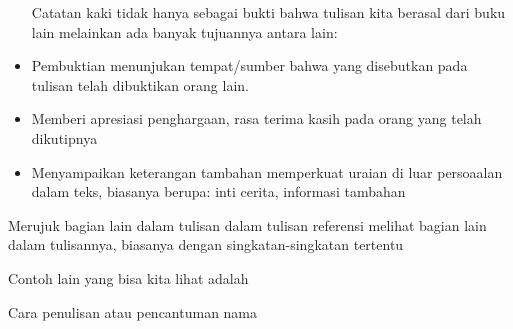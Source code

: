 \begin{itemize}
\vspace{\baselineskip}
Catatan kaki tidak hanya sebagai bukti bahwa tulisan kita berasal dari buku lain melainkan ada banyak tujuannya antara lain:\par

\vspace{\baselineskip}
	\item Pembuktian menunjukan tempat/sumber bahwa yang disebutkan pada tulisan telah dibuktikan orang lain.\par

\vspace{\baselineskip}
	\item Memberi apresiasi penghargaan, rasa terima kasih pada orang yang telah dikutipnya\par

\vspace{\baselineskip}
	\item Menyampaikan keterangan tambahan memperkuat uraian di luar persoaalan dalam teks, biasanya berupa: inti cerita, informasi tambahan
\end{itemize}\par

\vspace{\baselineskip}
\noindent Merujuk bagian lain dalam tulisan dalam tulisan referensi melihat bagian lain dalam tulisannya, biasanya dengan singkatan-singkatan tertentu\par

\vspace{\baselineskip}
\noindent Contoh lain yang bisa kita lihat adalah\par

\vspace{\baselineskip}
\noindent Cara penulisan atau pencantuman nama\par


